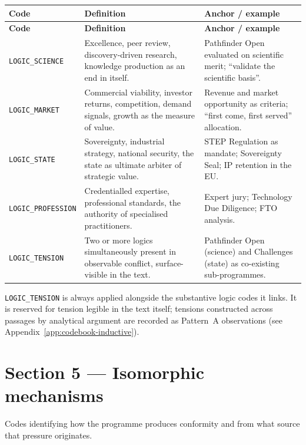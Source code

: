\begin{longtable}{@{} l p{4.3cm} p{6.3cm} @{}}
\toprule
\textbf{Code} & \textbf{Definition} & \textbf{Anchor / example} \\
\midrule
\endfirsthead
\toprule
\textbf{Code} & \textbf{Definition} & \textbf{Anchor / example} \\
\midrule
\endhead
\bottomrule
\endfoot
\texttt{LOGIC\_SCIENCE} & Excellence, peer review, discovery-driven research, knowledge production as an end in itself. & Pathfinder Open evaluated on scientific merit; \enquote{validate the scientific basis}. \\
\texttt{LOGIC\_MARKET} & Commercial viability, investor returns, competition, demand signals, growth as the measure of value. & Revenue and market opportunity as criteria; \enquote{first come, first served} allocation. \\
\texttt{LOGIC\_STATE} & Sovereignty, industrial strategy, national security, the state as ultimate arbiter of strategic value. & STEP Regulation as mandate; Sovereignty Seal; IP retention in the EU. \\
\texttt{LOGIC\_PROFESSION} & Credentialled expertise, professional standards, the authority of specialised practitioners. & Expert jury; Technology Due Diligence; FTO analysis. \\
\texttt{LOGIC\_TENSION} & Two or more logics simultaneously present in observable conflict, surface-visible in the text. & Pathfinder Open (science) and Challenges (state) as co-existing sub-programmes. \\
\end{longtable}

\texttt{LOGIC\_TENSION} is always applied alongside the substantive
logic codes it links. It is reserved for tension legible in the text
itself; tensions constructed across passages by analytical argument are
recorded as Pattern~A observations (see
Appendix~\ref{app:codebook-inductive}).

\section*{Section 5 --- Isomorphic mechanisms}

Codes identifying how the programme produces conformity and from what
source that pressure originates.

